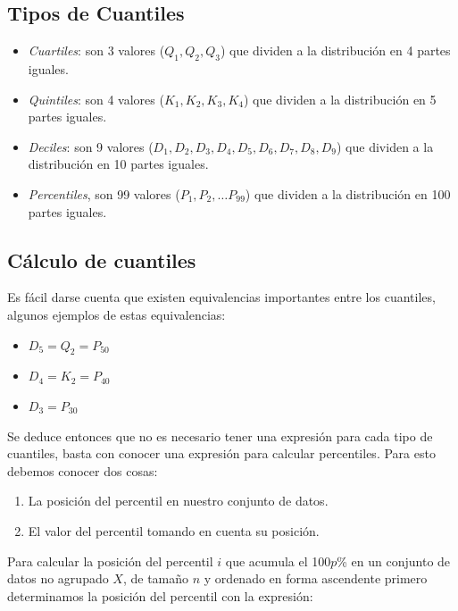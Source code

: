 \documentclass[]{book}
\providecommand{\tightlist}{%
  \setlength{\itemsep}{0pt}\setlength{\parskip}{0pt}}
\begin{document}
\subsection{Tipos de Cuantiles}\label{tipos-de-cuantiles}

\begin{itemize}
\item
  \emph{Cuartiles}: son 3 valores (\(Q_{1}, Q_{2}, Q_{3}\)) que dividen
  a la distribución en 4 partes iguales.
\item
  \emph{Quintiles}: son 4 valores (\(K_{1}, K_{2}, K_{3}, K_{4}\)) que
  dividen a la distribución en 5 partes iguales.
\item
  \emph{Deciles}: son 9 valores
  (\(D_1, D_2, D_3, D_4, D_5, D_6, D_7, D_8, D_9\)) que dividen a la
  distribución en 10 partes iguales.
\item
  \emph{Percentiles}, son 99 valores (\(P_1, P_2, \ldots P_{99}\)) que
  dividen a la distribución en 100 partes iguales.
\end{itemize}

\subsection{Cálculo de cuantiles}\label{calculo-de-cuantiles}

Es fácil darse cuenta que existen equivalencias importantes entre los
cuantiles, algunos ejemplos de estas equivalencias:

\begin{itemize}
\tightlist
\item
  \(D_5=Q_2=P_{50}\)
\item
  \(D_4=K_2=P_{40}\)
\item
  \(D_3=P_{30}\)
\end{itemize}

Se deduce entonces que no es necesario tener una expresión para cada
tipo de cuantiles, basta con conocer una expresión para calcular
percentiles. Para esto debemos conocer dos cosas:

\begin{enumerate}
\def\labelenumi{\arabic{enumi}.}
\tightlist
\item
  La posición del percentil en nuestro conjunto de datos.
\item
  El valor del percentil tomando en cuenta su posición.
\end{enumerate}

Para calcular la posición del percentil \(i\) que acumula el 100\(p\)\%
en un conjunto de datos no agrupado \(X\), de tamaño \(n\) y ordenado en
forma ascendente primero determinamos la posición del percentil con la
expresión:
\end{document}
